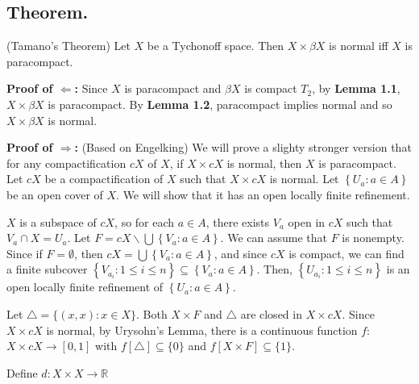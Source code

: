 \documentclass{article}
\begin{document}
	      \vskip 35pt



	      \subsection{Theorem.}
	      (Tamano's Theorem) Let $X$ be a Tychonoff space. Then $X \times \beta X$ is normal iff $X$ is paracompact. 

	      \vskip 10pt

	      \textbf{Proof of $\Leftarrow$:} 
	      Since $X$ is paracompact and $\beta X$ is compact $T_2$, by \textbf{Lemma 1.1}, $X\times \beta X$ is paracompact. 
	      By \textbf{Lemma 1.2}, paracompact implies normal and so $X\times \beta X$ is normal. 

	      \vskip 15pt



\textbf{Proof of $\Rightarrow$: } (Based on Engelking) 
    We will prove a slighty stronger version that for any compactification $cX$ of $X$, if $X \times cX$ is normal, 
    then $X$ is paracompact. 
    \vskip 10pt
    Let $cX$ be a compactification of $X$ such that $X \times cX$ is normal. Let 
    $\left\{U_a: a \in A\right\}$ be an open cover of $X$. We will show that it has an open locally finite refinement.

    \vskip 10pt

    $X$ is a subspace of $cX$, so for each $a \in A$, there exists $V_a$ open in $cX$ such that $V_a \cap X = U_a.$ Let $F=cX\backslash \bigcup \left\{V_a: a\in A\right\}$.  We can assume that $F$ is nonempty. Since if $F=\emptyset$, then $cX=\bigcup \left\{V_a: a\in A\right\}$, and since $cX$ is compact, we can find a finite subcover $\left\{V_{a_i}: 1\leq i \leq n\right\}\subseteq \left\{V_a: a\in A\right\}$. Then, $\left\{U_{a_i}: 1\leq i\leq n\right\}$ is an open locally finite refinement of $\left\{U_a: a \in A\right\}$. 


    \vskip 10pt

    Let $\triangle = \{(x,x): x \in X\}.$
    Both $X \times F$ and $\triangle$ are closed in $X \times cX $. Since $X \times cX $ is normal, by Urysohn's Lemma, there is 
    a continuous function $f$: $X \times cX \rightarrow [0,1]$ with $f[\triangle] \subseteq \{0\}$ and $f[X\times F] \subseteq
    \{1\}$. 

    \vskip 15pt 

    Define $d: X\times X \rightarrow \mathbb{R}$ 
\end{document}
